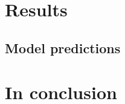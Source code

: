 \documentclass[fleqn,10pt]{SelfArx} %
\begin{document}
\section{Results}

\subsection{Model predictions}

\section{In conclusion}
	
	
	\printbibliography
	
	
\end{document}

